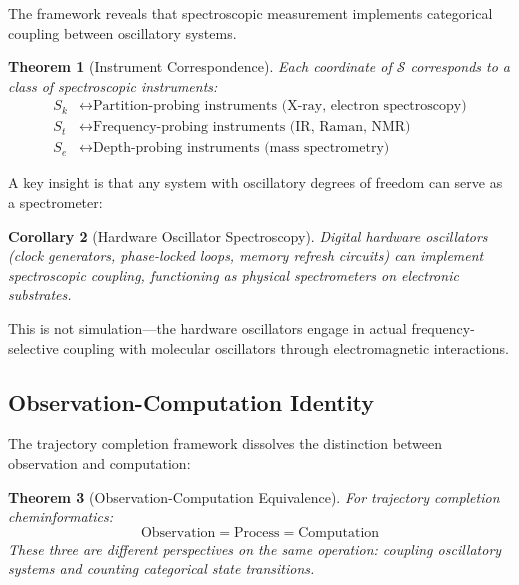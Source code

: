 \documentclass[twocolumn,10pt,a4paper]{article}
\newtheorem{theorem}{Theorem}[section]
\newtheorem{corollary}[theorem]{Corollary}
\newcommand{\Sspace}{\mathcal{S}}
\newcommand{\Sk}{S_k}
\newcommand{\St}{S_t}
\newcommand{\Se}{S_e}
\begin{document}
The framework reveals that spectroscopic measurement implements categorical coupling between oscillatory systems.

\begin{theorem}[Instrument Correspondence]
\label{thm:instrument}
Each coordinate of $\Sspace$ corresponds to a class of spectroscopic instruments:
\begin{align}
\Sk &\leftrightarrow \text{Partition-probing instruments (X-ray, electron spectroscopy)} \\
\St &\leftrightarrow \text{Frequency-probing instruments (IR, Raman, NMR)} \\
\Se &\leftrightarrow \text{Depth-probing instruments (mass spectrometry)}
\end{align}
\end{theorem}

A key insight is that any system with oscillatory degrees of freedom can serve as a spectrometer:

\begin{corollary}[Hardware Oscillator Spectroscopy]
Digital hardware oscillators (clock generators, phase-locked loops, memory refresh circuits) can implement spectroscopic coupling, functioning as physical spectrometers on electronic substrates.
\end{corollary}

This is not simulation---the hardware oscillators engage in actual frequency-selective coupling with molecular oscillators through electromagnetic interactions.

\subsection{Observation-Computation Identity}

The trajectory completion framework dissolves the distinction between observation and computation:

\begin{theorem}[Observation-Computation Equivalence]
\label{thm:obs_comp}
For trajectory completion cheminformatics:
\begin{equation}
\text{Observation} = \text{Process} = \text{Computation}
\end{equation}
These three are different perspectives on the same operation: coupling oscillatory systems and counting categorical state transitions.
\end{theorem}
\end{document}
